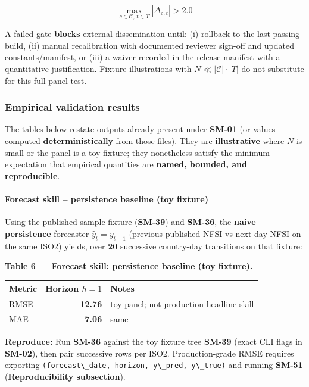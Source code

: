 \documentclass[
  11pt,
  peerreview,journal,onecolumn]{IEEEtran}
\newcommand{\passthrough}[1]{#1}
\begin{document}
\[\max_{c \in \mathcal{C},\, t \in T} |\Delta_{c,t}| > 2.0\]

A failed gate \textbf{blocks} external dissemination until: (i) rollback
to the last passing build, (ii) manual recalibration with documented
reviewer sign-off and updated constants/manifest, or (iii) a waiver
recorded in the release manifest with a quantitative justification.
Fixture illustrations with \(N \ll |\mathcal{C}|\cdot|T|\) do not
substitute for this full-panel test.

\hypertarget{empirical-validation-results}{%
\subsubsection{Empirical validation
results}\label{empirical-validation-results}}

The tables below restate outputs already present under \textbf{SM-01}
(or values computed \textbf{deterministically} from those files). They
are \textbf{illustrative} where \(N\) is small or the panel is a toy
fixture; they nonetheless satisfy the minimum expectation that empirical
quantities are \textbf{named, bounded, and reproducible}.

\hypertarget{forecast-skill-persistence-baseline-toy-fixture}{%
\paragraph{Forecast skill -- persistence baseline (toy
fixture)}\label{forecast-skill-persistence-baseline-toy-fixture}}

Using the published sample fixture (\textbf{SM-39}) and \textbf{SM-36},
the \textbf{naive persistence} forecaster \(\hat{y}_{t}=y_{t-1}\)
(previous published NFSI vs next-day NFSI on the same ISO2) yields, over
\textbf{20} successive country-day transitions on that fixture:

\textbf{Table 6 --- Forecast skill: persistence baseline (toy fixture).}

\begin{longtable}[]{@{}lrl@{}}
\toprule\noalign{}
Metric & Horizon \(h=1\) & Notes \\
\midrule\noalign{}
\endhead
\bottomrule\noalign{}
\endlastfoot
RMSE & \textbf{12.76} & toy panel; not production headline skill \\
MAE & \textbf{7.06} & same \\
\end{longtable}

\textbf{Reproduce:} Run \textbf{SM-36} against the toy fixture tree
\textbf{SM-39} (exact CLI flags in \textbf{SM-02}), then pair successive
rows per ISO2. Production-grade RMSE requires exporting
\passthrough{\lstinline!(forecast\_date, horizon, y\_pred, y\_true)!}
and running \textbf{SM-51} (\textbf{Reproducibility subsection}).
\end{document}
